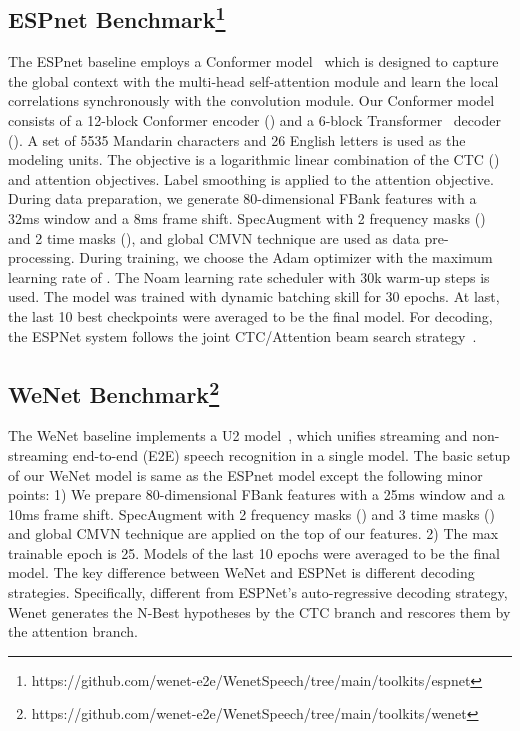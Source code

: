 \documentclass{article}
\begin{document}
\subsection[ESPnet Benchmark]{ESPnet Benchmark\footnote{https://github.com/wenet-e2e/WenetSpeech/tree/main/toolkits/espnet}}
\vspace{-0.5em}
The ESPnet baseline employs a Conformer model~\cite{gulati2020conformer,guo2021recent} which is designed to capture the global context with the multi-head self-attention module and learn the local correlations synchronously with the convolution module. Our Conformer model consists of a 12-block Conformer encoder () and a 6-block Transformer~\cite{vaswani2017attention} decoder (). A set of 5535 Mandarin characters and  26 English letters is used as the modeling units. The objective is a logarithmic linear combination of the CTC () and attention objectives. Label smoothing is applied to the attention objective. During data preparation, we generate 80-dimensional FBank features with a 32ms window and a 8ms frame shift. SpecAugment with 2 frequency masks () and 2 time masks (), and global CMVN technique are used as data pre-processing. During training, we choose the Adam optimizer with the maximum learning rate of . The Noam learning rate scheduler with 30k warm-up steps is used. The model was trained with dynamic batching skill for 30 epochs. At last, the last 10 best checkpoints were averaged to be the final model. For decoding, the ESPNet system follows the joint CTC/Attention beam search strategy~\cite{hori2017joint}.

\vspace{-1em}
\subsection[WeNet Benchmark]{WeNet Benchmark\footnote{https://github.com/wenet-e2e/WenetSpeech/tree/main/toolkits/wenet}}
\vspace{-0.5em}
The WeNet baseline implements a U2 model~\cite{yao2021wenet}, which unifies streaming and non-streaming end-to-end (E2E) speech recognition in a single model. The basic setup of our WeNet model is same as the ESPnet model except the following minor points: 1) We prepare 80-dimensional FBank features with a 25ms window and a 10ms frame shift. SpecAugment with 2 frequency masks () and 3 time masks () and global CMVN technique are applied on the top of our features. 2) The max trainable epoch is 25. Models of the last 10 epochs were averaged to be the final model. The key difference between WeNet and ESPNet is different decoding strategies. Specifically, different from ESPNet's auto-regressive decoding strategy, Wenet generates the N-Best hypotheses by the CTC branch and rescores them by the attention branch.
\end{document}

